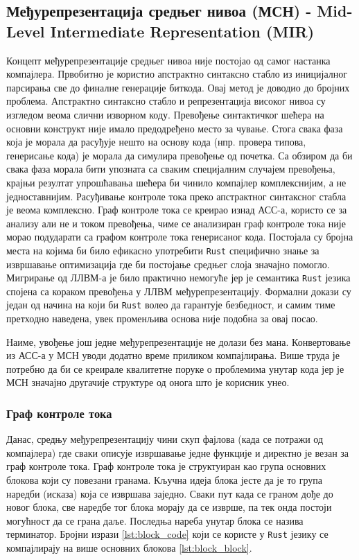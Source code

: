 \subsection{Међурепрезентација средњег нивоа (МСН) - Mid-Level Intermediate Representation (MIR)}

Концепт међурепрезентације средњег нивоа није постојао од самог настанка компајлера. Првобитно је користио апстрактно синтаксно стабло 
из иницијалног парсирања све до финалне генерације биткода. Овај метод је доводио до бројних проблема. Апстрактно синтаксно стабло и репрезентација 
високог нивоа су изгледом веома слични изворном коду. Превођење синтактичког шећера на основни конструкт није имало предодређено место за чување. 
Стога свака фаза која је морала да расуђује нешто на основу кода (нпр. провера типова, генерисање кода) је морала да симулира превођење од почетка.
Са обзиром да би свака фаза морала бити упозната са сваким специјалним случајем превођења, крајњи резултат упрошћавања шећера би чинило компајлер 
комплекснијим, а не једноставнијим. Расуђивање контроле тока преко апстрактног синтаксног стабла је веома комплексно. Граф контроле тока се креирао
изнад АСС-а, користо се за анализу али не и током превођења, чиме се анализиран граф контроле тока није морао подударати са графом контроле тока генерисаног кода. 
Постојала су бројна места на којима би било ефикасно употребити \verb|Rust| специфично знање за извршавање оптимизација где би постојање средњег слоја значајно помогло.
Мигрирање од ЛЛВМ-а је било практично немогуће јер је семантика \verb|Rust| језика спојена са кораком превођења у ЛЛВМ међурепрезентацију.
Формални докази су један од начина на који би \verb|Rust| волео да гарантује безбедност, и самим тиме претходно наведена, увек променљива 
основа није подобна за овај посао.

Наиме, увођење још једне међурепрезентације не долази без мана. Конвертовање из АСС-а у МСН уводи додатно време приликом компајлирања. Више труда је потребно 
да би се креирале квалитетне поруке о проблемима унутар кода јер је МСН значајно другачије структуре од онога што је корисник унео.

\subsubsection{Граф контроле тока}

Данас, средњу међурепрезентацију чини скуп фајлова (када се потражи од компајлера) где сваки описује извршавање једне функције и директно је везан за граф контроле тока. Граф контроле тока је 
структуиран као група основних блокова који су повезани гранама. Кључна идеја блока јесте да је то група наредби (исказа) 
која се извршава заједно. Сваки пут када се граном дође до новог блока, све наредбе тог блока морају да се изврше, па тек онда постоји могућност 
да се грана даље. Последња нареба унутар блока се назива терминатор. Бројни изрази \ref{lst:block_code} који се користе у \verb|Rust| језику се компајлирају на 
више основних блокова \ref{lst:block_block}.

